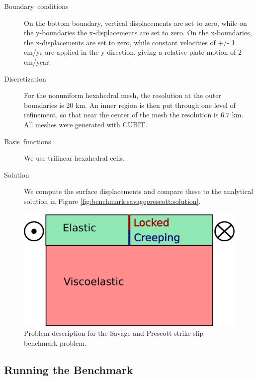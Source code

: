 \begin{description}
\item [{Boundary~conditions}] On the bottom boundary, vertical displacements
are set to zero, while on the y-boundaries the x-displacements are
set to zero. On the x-boundaries, the x-displacements are set to zero,
while constant velocities of +/- 1 cm/yr are applied in the y-direction,
giving a relative plate motion of 2 cm/year.
\item [{Discretization}] For the nonuniform hexahedral mesh, the resolution
at the outer boundaries is 20 km. An inner region is then put through
one level of refinement, so that near the center of the mesh the resolution
is 6.7 km. All meshes were generated with CUBIT.
\item [{Basis~functions}] We use trilinear hexahedral cells.
\item [{Solution}] We compute the surface displacements and compare these
to the analytical solution in Figure \ref{fig:benchmark:savageprescott:solution}.
\end{description}
\noindent \begin{center}
\begin{figure}[H]
\begin{centering}
\includegraphics[scale=0.33]{benchmarks/savageprescott/figs/model_descript}
\par\end{centering}

\caption{Problem description for the Savage and Prescott strike-slip benchmark
problem.\label{fig:benchmark:savageprescott:geometry}}
\end{figure}

\par\end{center}


\subsection{Running the Benchmark}

